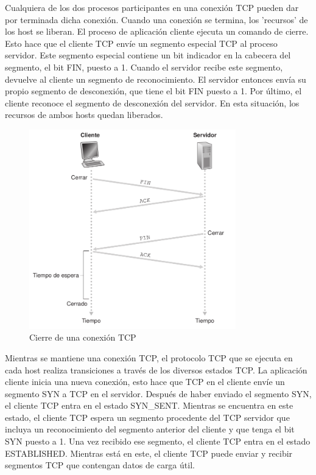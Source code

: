 \documentclass[a4paper,11pt]{article}
\begin{document}
Cualquiera de los dos procesos participantes en una conexión TCP pueden dar por terminada dicha conexión. Cuando una conexión se termina, los 'recursos' de los host se liberan. El proceso de aplicación cliente ejecuta un comando de cierre. Esto hace que el cliente TCP envíe un segmento especial TCP al proceso servidor. Este segmento especial contiene un bit indicador en la cabecera del segmento, el bit FIN, puesto a 1. Cuando el servidor recibe este segmento, devuelve al cliente un segmento de reconocimiento. El servidor entonces envía su propio segmento de desconexión, que tiene el bit FIN puesto a 1. Por último, el cliente reconoce el segmento de desconexión del servidor. En esta situación, los recursos de ambos hosts quedan liberados. \\

\begin{figure}[h]
\centering
\caption{Cierre de una conexión TCP}
\includegraphics[scale=1,width=0.8\textwidth]{ejemplo_desconexion.png}
\end{figure}

Mientras se mantiene una conexión TCP, el protocolo TCP que se ejecuta en cada host realiza transiciones a través de los diversos estados TCP. La aplicación cliente inicia una nueva conexión, esto hace que TCP en el cliente envíe un segmento SYN a TCP en el servidor. Después de haber enviado el segmento SYN, el cliente TCP entra en el estado SYN\_SENT. Mientras se encuentra en este estado, el cliente TCP espera un segmento procedente del TCP servidor que incluya un reconocimiento del segmento anterior del cliente y que tenga el bit SYN puesto a 1. Una vez recibido ese segmento, el cliente TCP entra en el estado ESTABLISHED. Mientras está en este, el cliente TCP puede enviar y recibir segmentos TCP que contengan datos de carga útil. \\
\end{document}
